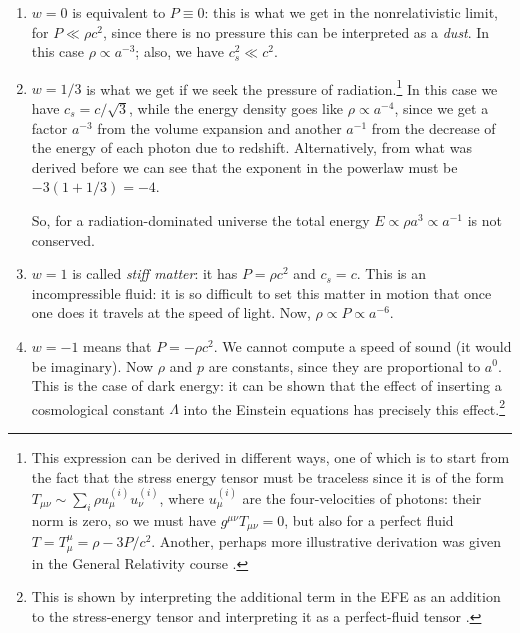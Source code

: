 \documentclass[main.tex]{subfiles}
\begin{document}
\begin{enumerate}
  \item \(w = 0\) is equivalent to \(P \equiv 0\): this is what we get in the nonrelativistic limit, for \(P \ll \rho c^2\), since there is no pressure this can be interpreted as a \emph{dust}. In this case \(\rho \propto a^{-3}\); also, we have \(c_s^2 \ll c^2\). 
  \item \(w = 1/3\) is what we get if we seek the pressure of radiation.\footnote{This expression can be derived in different ways, one of which is to start from the fact that the stress energy tensor must be traceless since it is of the form \(T_{\mu \nu } \sim \sum _{i} \rho u^{(i)}_{\mu } u^{(i)}_{\nu }\), where \(u_{\mu }^{(i)}\) are the four-velocities of photons: their norm is zero, so we must have \(g^{\mu \nu} T_{\mu \nu } = 0\), but also for a perfect fluid \(T = T^{\mu }_{\mu } = \rho - 3 P/c^2\). Another, perhaps more illustrative derivation was given in the General Relativity course \cite[pag. 86-87]{tissinoGeneralRelativityNotes2020}.}
  In this case we have \(c_s = c/ \sqrt{3}\), while the energy density goes like \(\rho \propto a^{-4}\), since we get a factor \(a^{-3}\) from the volume expansion and another \(a^{-1}\) from the decrease of the energy of each photon due to redshift. 
  Alternatively, from what was derived before we can see that the exponent in the powerlaw must be \(- 3(1+1/3) = -4\).
  
  So, for a radiation-dominated universe the total energy \(E \propto \rho a^{3} \propto a^{-1}\) is not conserved. 
  \item \(w=1\) is called \emph{stiff matter}: it has \(P = \rho c^2\) and  \(c_s = c\). 
  This is an incompressible fluid: it is so difficult to set this matter in motion that once one does it travels at the speed of light. Now, \(\rho \propto P \propto a^{-6}\). 
  \item \(w=-1\) means that \(P = - \rho c^2\). We cannot compute a speed of sound (it would be imaginary).
  Now \(\rho\) and \(p\) are constants, since they are proportional to \(a^{0}\). This is the case of dark energy: it can be shown that the effect of inserting a cosmological constant \(\Lambda\) into the Einstein equations has precisely this effect.\footnote{This is shown by interpreting the additional term in the EFE as an addition to the stress-energy tensor and interpreting it as a perfect-fluid tensor \cite[eqs. 434-438]{tissinoGeneralRelativityNotes2020}.}
\end{enumerate}
\end{document}
